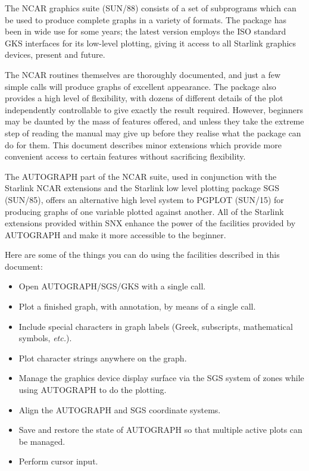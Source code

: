 \documentclass[twoside,11pt]{article}
\renewcommand{\_}{\texttt{\symbol{95}}}
\begin{document}
The NCAR graphics suite (SUN/88) consists of a set of subprograms which
can be used to produce complete graphs in a variety of formats.  The
package has been in wide use for some years; the latest version employs
the ISO standard GKS interfaces for its low-level plotting, giving it
access to all Starlink graphics devices, present and future.

The NCAR routines themselves are thoroughly documented, and just a few
simple calls will produce graphs of excellent appearance.  The package
also provides a high level of flexibility, with dozens of different
details of the plot independently controllable to give exactly the
result required.  However, beginners may be daunted by the mass of
features offered, and unless they take the extreme step of reading the
manual may give up before they realise what the package can do for
them.  This document describes minor extensions which provide more
convenient access to certain features without sacrificing flexibility.

The AUTOGRAPH part of the NCAR suite, used in conjunction with the
Starlink NCAR extensions and the Starlink low level plotting package
SGS (SUN/85), offers an alternative high level system to PGPLOT
(SUN/15) for producing graphs of one variable plotted against another.
All of the Starlink extensions provided within SNX enhance the power of
the facilities provided by AUTOGRAPH and make it more accessible to the
beginner.

Here are some of the things you can do using the facilities described
in this document:

\begin{itemize}

\item Open AUTOGRAPH/SGS/GKS with a single call.

\item Plot a finished graph, with annotation, by means of a single call.

\item Include special characters in graph labels (Greek, subscripts,
mathematical symbols, {\em etc.}).

\item Plot character strings anywhere on the graph.

\item Manage the graphics device display surface via the SGS system of
zones while using AUTOGRAPH to do the plotting.

\item Align the AUTOGRAPH and SGS coordinate systems.

\item Save and restore the state of AUTOGRAPH so that multiple active
plots can be managed.

\item Perform cursor input.

\end{itemize}
\end{document}
